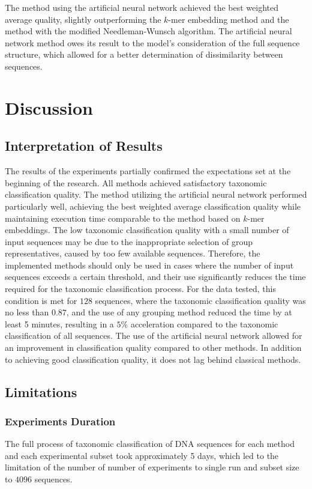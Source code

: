 \documentclass{article}
\begin{document}
                The method using the artificial neural network achieved the best weighted average quality, slightly outperforming the $k$-mer embedding method and the method with the modified Needleman-Wunsch algorithm. The artificial neural network method owes its result to the model's consideration of the full sequence structure, which allowed for a better determination of dissimilarity between sequences.

    \clearpage
    \section{Discussion}

        \subsection{Interpretation of Results}

            The results of the experiments partially confirmed the expectations set at the beginning of the research. All methods achieved satisfactory taxonomic classification quality. The method utilizing the artificial neural network performed particularly well, achieving the best weighted average classification quality while maintaining execution time comparable to the method based on $k$-mer embeddings. The low taxonomic classification quality with a small number of input sequences may be due to the inappropriate selection of group representatives, caused by too few available sequences. Therefore, the implemented methods should only be used in cases where the number of input sequences exceeds a certain threshold, and their use significantly reduces the time required for the taxonomic classification process. For the data tested, this condition is met for $128$ sequences, where the taxonomic classification quality was no less than $0.87$, and the use of any grouping method reduced the time by at least 5 minutes, resulting in a $5\%$ acceleration compared to the taxonomic classification of all sequences. The use of the artificial neural network allowed for an improvement in classification quality compared to other methods. In addition to achieving good classification quality, it does not lag behind classical methods.

        \subsection{Limitations}

            \subsubsection{Experiments Duration}
                The full process of taxonomic classification of DNA sequences for each method and each experimental subset took approximately 5 days, which led to the limitation of the number of number of experiments to single run and subset size to $4096$ sequences.
\end{document}
